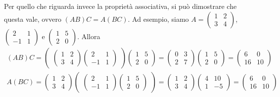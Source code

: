 Per quello che riguarda invece la proprietà associativa, si può dimostrare che questa vale,
ovvero $(AB)C=A(BC)$. Ad esempio, siamo $A=
\begin{pmatrix}
  1 &2 \\
  3 &4
\end{pmatrix}
$,
$\begin{pmatrix}
   2 & 1\\
   -1 & 1
\end{pmatrix}$ e
$\begin{pmatrix}
   1 &5 \\
   2 &0
\end{pmatrix}$. Allora
\begin{eqnarray*}
  (AB)C=
  \begin{pmatrix}
    \begin{pmatrix}
      1 &2\\
      3 &4
    \end{pmatrix}
    \begin{pmatrix}
      2 & 1\\
      -1 & 1
    \end{pmatrix}
  \end{pmatrix}
  \begin{pmatrix}
    1 &5\\
    2 &0
  \end{pmatrix}=
  \begin{pmatrix}
    0& 3\\
    2 &7 
  \end{pmatrix}
  \begin{pmatrix}
    1 & 5\\
    2 &0
  \end{pmatrix}=
  \begin{pmatrix}
    6 &0\\
    16 & 10
  \end{pmatrix}\\
  A(BC)=
  \begin{pmatrix}
    1 &2 \\
    3 &4
  \end{pmatrix}
  \begin{pmatrix}
     \begin{pmatrix}
      2 & 1\\
      -1 & 1
    \end{pmatrix}
    \begin{pmatrix}
      1 &5\\
      2 &0
    \end{pmatrix}  
  \end{pmatrix}=
  \begin{pmatrix}
    1 &2 \\
    3 &4
  \end{pmatrix}
  \begin{pmatrix}
    4 &10\\
    1 & -5
  \end{pmatrix}=
  \begin{pmatrix}
    6 &0\\
    16 & 10
  \end{pmatrix}
\end{eqnarray*}
